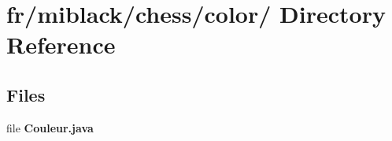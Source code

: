 \section{fr/miblack/chess/color/ Directory Reference}
\label{dir_04b9ffbc14e19d1069d40c59f473fe69}
\subsection*{Files}
\begin{DoxyCompactItemize}
\item 
file {\bfseries Couleur.\-java}
\end{DoxyCompactItemize}
